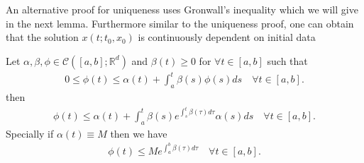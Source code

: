 \begin{remark}
 An alternative proof for uniqueness uses  Gronwall's inequality
 which we will give in the next lemma. Furthermore similar to the uniqueness proof, one can 
 obtain that the solution $x(t; t_{0},x_{0})$ is continuously dependent on initial data
\end{remark}
\begin{lemma}\label{gronwall_lemma}
  Let $\alpha ,\beta ,\phi  \in  \mathcal{C}([a,b];\mathbb{R}^{d} )$  and $\beta (t) \ge 0$ for $\forall t \in [a,b]$ 
  such that 
  \begin{align*}
    0 \le  \phi(t) \le  \alpha(t) + \int_a^{t} \beta(s)\phi(s) ds \quad \forall t \in [a,b] 
  .\end{align*}
  then 
  \begin{align*}
    \phi(t) \le  \alpha(t) + \int_a^{t}  \beta(s) e^{\int_s^{t} \beta(\tau ) d\tau  }  \alpha(s) ds \quad \forall t \in [a,b]
  .\end{align*}
  Specially if $\alpha(t) \equiv M$ then we have 
  \begin{align*}
    \phi(t) \le  M e^{\int_a^{b} \beta(\tau )d\tau  }  \quad \forall t \in [a,b]
  .\end{align*}
\end{lemma}

